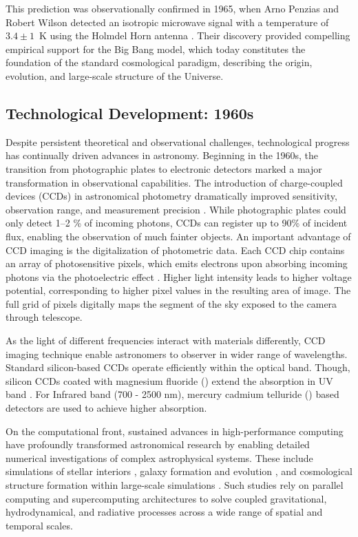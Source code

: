 This prediction was observationally confirmed in 1965, when Arno Penzias and Robert Wilson detected an isotropic microwave signal with a temperature of $3.4 \pm 1$~K using the Holmdel Horn antenna \citep{1965penzias}. Their discovery provided compelling empirical support for the Big Bang model, which today constitutes the foundation of the standard cosmological paradigm, describing the origin, evolution, and large-scale structure of the Universe.


\subsection{Technological Development: 1960s}

Despite persistent theoretical and observational challenges, technological progress has continually driven advances in astronomy. Beginning in the 1960s, the transition from photographic plates to electronic detectors marked a major transformation in observational capabilities. The introduction of charge-coupled devices (CCDs) in astronomical photometry dramatically improved sensitivity, observation range, and measurement precision \citep{2023roth}. While photographic plates could only detect 1–2 \% of incoming photons, CCDs can register up to 90\% of incident flux, enabling the observation of much fainter objects. An important advantage of CCD imaging is the digitalization of photometric data. Each CCD chip contains an array of photosensitive pixels, which emits electrons upon absorbing incoming photons via the photoelectric effect \citep{1905einstein}. Higher light intensity leads to higher voltage potential, corresponding to higher pixel values in the resulting area of image. The full grid of pixels digitally maps the segment of the sky exposed to the camera through telescope.

As the light of different frequencies interact with materials differently, CCD imaging technique enable astronomers to observer in wider range of wavelengths. Standard silicon-based CCDs operate efficiently within the optical band. Though, silicon CCDs coated with magnesium fluoride () extend the absorption in UV band \citep{2011hamden}. For Infrared band (700 - 2500 nm), mercury cadmium telluride () based detectors are used to achieve higher absorption\citep{2009fox}.

On the computational front, sustained advances in high-performance computing have profoundly transformed astronomical research by enabling detailed numerical investigations of complex astrophysical systems. These include simulations of stellar interiors \citep{1990kippenhahn}, galaxy formation and evolution \citep{1993navarro}, and cosmological structure formation within large-scale simulations \citep{2025TNGCluster}. Such studies rely on parallel computing and supercomputing architectures to solve coupled gravitational, hydrodynamical, and radiative processes across a wide range of spatial and temporal scales.

